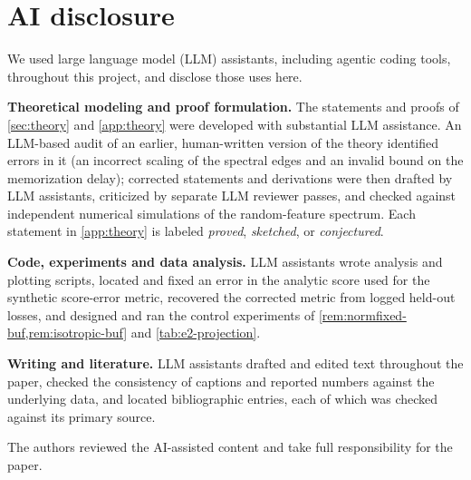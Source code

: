 \section*{AI disclosure}
We used large language model (LLM) assistants, including agentic coding tools, throughout this project, and disclose those uses here.

\textbf{Theoretical modeling and proof formulation.} The statements and proofs of \cref{sec:theory} and \cref{app:theory} were developed with substantial LLM assistance. An LLM-based audit of an earlier, human-written version of the theory identified errors in it (an incorrect scaling of the spectral edges and an invalid bound on the memorization delay); corrected statements and derivations were then drafted by LLM assistants, criticized by separate LLM reviewer passes, and checked against independent numerical simulations of the random-feature spectrum. Each statement in \cref{app:theory} is labeled \emph{proved}, \emph{sketched}, or \emph{conjectured}. 

\textbf{Code, experiments and data analysis.} LLM assistants wrote analysis and plotting scripts, located and fixed an error in the analytic score used for the synthetic score-error metric, recovered the corrected metric from logged held-out losses, and designed and ran the control experiments of \cref{rem:normfixed-buf,rem:isotropic-buf} and \cref{tab:e2-projection}. 

\textbf{Writing and literature.} LLM assistants drafted and edited text throughout the paper, checked the consistency of captions and reported numbers against the underlying data, and located bibliographic entries, each of which was checked against its primary source.

The authors reviewed the AI-assisted content and take full responsibility for the paper.
